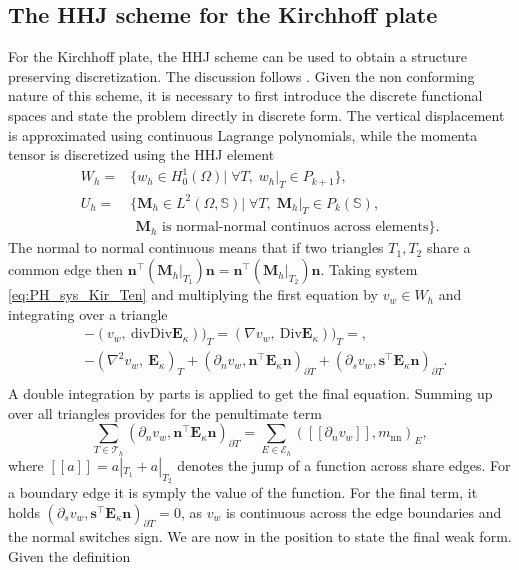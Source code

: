\documentclass{ifacconf}
\begin{document}
\subsection{The HHJ scheme for the Kirchhoff plate}
For the Kirchhoff plate, the HHJ scheme can be used to obtain a structure preserving discretization. The discussion follows \cite{arnold2019hellan}. Given the non conforming nature of this scheme, it is necessary to first introduce the discrete functional spaces and state the problem directly in discrete form. The vertical displacement is approximated using continuous Lagrange polynomials, while the momenta tensor is discretized using the HHJ element
\begin{equation}
\label{eq:HHJ}
\begin{aligned}
W_h = &\{w_h \in H^1_0(\Omega)| \; \forall T, \; w_h|_{T} \in P_{k+1} \}, \\
U_h = &\{\bm{M}_h \in L^2(\Omega, \mathbb{S})| \; \forall T, \; \bm{M}_h|_{T} \in P_{k}(\mathbb{S}) , \\ 
&\, \ \bm{M}_h \text{ is normal-normal continuos across elements}\}.
\end{aligned}
\end{equation}
The normal to normal continuous means that if two triangles $T_1, T_2$ share a common edge then $\bm{n}^\top (\bm{M}_h|_{T_1}) \bm{n} = \bm{n}^\top (\bm{M}_h|_{T_2}) \bm{n}$. Taking system \eqref{eq:PH_sys_Kir_Ten} and multiplying the first equation by $v_w \in W_h$ and integrating over a triangle
\begin{equation*}
	\begin{aligned}
	& - (v_w, \ \mathrm{div}\mathrm{Div} \bm{E}_\kappa))_{T} = (\nabla v_w, \ \mathrm{Div} \bm{E}_\kappa))_{T}=, \\
	& -(\nabla^2 v_w, \ \bm{E}_\kappa)_T + (\partial_n v_w, \bm{n}^\top\bm{E}_\kappa \bm{n})_{\partial T} + (\partial_s v_w, \bm{s}^\top\bm{E}_\kappa \bm{n})_{\partial T}. \\
	\end{aligned}
\end{equation*}
A double integration by parts is applied to get the final equation. Summing up over all triangles provides for the penultimate term
\begin{equation*}
\sum_{T \in \mathcal{T}_h} (\partial_n v_w, \bm{n}^\top\bm{E}_\kappa \bm{n})_{\partial T} = \sum_{E \in \mathcal{E}_h} ([\![\partial_n v_w]\!], m_{\text{nn}})_{E},
\end{equation*} 
where $[\![a]\!] = a|_{T_1} + a|_{T_2}$ denotes the jump of a function across share edges. For a boundary edge it is symply the value of the function. For the final term, it holds $(\partial_s v_w, \bm{s}^\top\bm{E}_\kappa \bm{n})_{\partial T}=0$, as $v_w$ is continuous across the edge boundaries and the normal switches sign. We are now in the position to state the final weak form. Given the definition
\end{document}
